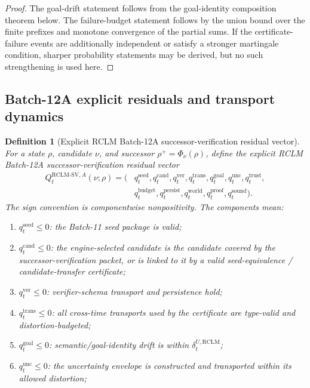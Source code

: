 \documentclass[11pt,a4paper]{article}
\newtheorem{definition}[theorem]{Definition}
\newcommand{\RCLM}{\mathrm{RCLM}}
\begin{document}
\begin{proof}
The goal-drift statement follows from the goal-identity composition theorem below. The failure-budget statement follows by the union bound over the finite prefixes and monotone convergence of the partial sums. If the certificate-failure events are additionally independent or satisfy a stronger martingale condition, sharper probability statements may be derived, but no such strengthening is used here.
\end{proof}

\subsection{Batch-12A explicit residuals and transport dynamics}

\begin{definition}[Explicit RCLM Batch-12A successor-verification residual vector]
\label{def:rclm-batch12a-explicit-sv-residual-vector}
For a state \(\rho\), candidate \(\nu\), and successor \(\rho^+=\Phi_\nu(\rho)\), define the explicit RCLM Batch-12A successor-verification residual vector
\[
\begin{aligned}
Q_t^{\RCLM\text{-}\mathrm{SV},A}(\nu;\rho)=(&
q_t^{\mathrm{seed}},q_t^{\mathrm{cand}},q_t^{\mathrm{ver}},q_t^{\mathrm{trans}},q_t^{\mathrm{goal}},q_t^{\mathrm{unc}},q_t^{\mathrm{trust}},\\
&q_t^{\mathrm{budget}},q_t^{\mathrm{persist}},q_t^{\mathrm{world}},q_t^{\mathrm{proof}},q_t^{\mathrm{sound}}).
\end{aligned}
\]
The sign convention is componentwise nonpositivity. The components mean:
\begin{enumerate}[label=(\roman*),leftmargin=1.5em]
    \item \(q_t^{\mathrm{seed}}\le0\): the Batch-11 seed package is valid;
    \item \(q_t^{\mathrm{cand}}\le0\): the engine-selected candidate is the candidate covered by the successor-verification packet, or is linked to it by a valid seed-equivalence / candidate-transfer certificate;
    \item \(q_t^{\mathrm{ver}}\le0\): verifier-schema transport and persistence hold;
    \item \(q_t^{\mathrm{trans}}\le0\): all cross-time transports used by the certificate are type-valid and distortion-budgeted;
    \item \(q_t^{\mathrm{goal}}\le0\): semantic/goal-identity drift is within \(\delta_t^{U,\RCLM}\);
    \item \(q_t^{\mathrm{unc}}\le0\): the uncertainty envelope is constructed and transported within its allowed distortion;

\end{enumerate}
\end{definition}
\end{document}
